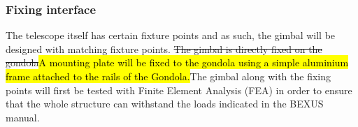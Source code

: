 \subsubsection{Fixing interface}
\label {sec:4.4.5}
The telescope itself has certain fixture points and as such, the gimbal will be designed with matching fixture points.\st{ The gimbal is directly fixed on the gondola}\hl{A mounting plate will be fixed to the gondola using a simple aluminium frame attached to the rails of the Gondola.}The gimbal along with the fixing points will first be tested with Finite Element Analysis (FEA) in order to ensure that the whole structure can withstand the loads indicated in the BEXUS manual.
